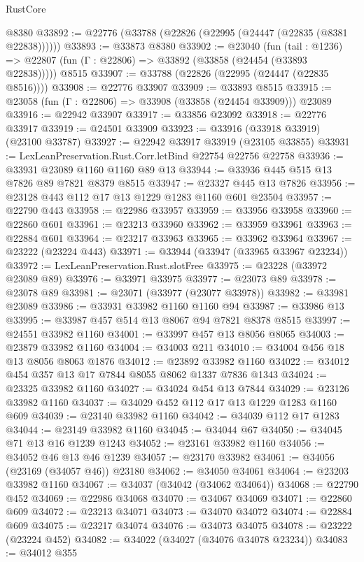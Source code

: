 \begin{lexlean}{RustCore}
\begin{coremodule}
    @8380
@33892 := @22776 (@33788 (@22826 (@22995 (@24447 (@22835 (@8381 @22838))))))
@33893 := @33873 @8380
@33902 := @23040
    (fun (tail : @1236) => @22807 (fun (Γ : @22806) => @33892 (@33858 (@24454 (@33893 @22838)))))
    @8515
@33907 := @33788 (@22826 (@22995 (@24447 (@22835 @8516))))
@33908 := @22776 @33907
@33909 := @33893 @8515
@33915 := @23058 (fun (Γ : @22806) => @33908 (@33858 (@24454 @33909))) @23089
@33916 := @22942 @33907
@33917 := @33856 @23092
@33918 := @22776 @33917
@33919 := @24501 @33909
@33923 := @33916 (@33918 @33919) (@23100 @33787)
@33927 := @22942 @33917 @33919 (@23105 @33855)
@33931 := LexLeanPreservation.Rust.Corr.letBind @22754 @22756 @22758
@33936 := @33931 @23089 @1160 @1160 @89 @13
@33944 := @33936 @445 @515 @13 @7826 @89 @7821 @8379 @8515
@33947 := @23327 @445 @13 @7826
@33956 := @23128 @443 @112 @17 @13 @1229 @1283 @1160 @601 @23504
@33957 := @22790 @443
@33958 := @22986 @33957
@33959 := @33956 @33958
@33960 := @22860 @601
@33961 := @23213 @33960
@33962 := @33959 @33961
@33963 := @22884 @601
@33964 := @23217 @33963
@33965 := @33962 @33964
@33967 := @23222 (@23224 @443)
@33971 := @33944 (@33947 (@33965 @33967 @23234))
@33972 := LexLeanPreservation.Rust.slotFree
@33975 := @23228 (@33972 @23089 @89)
@33976 := @33971 @33975
@33977 := @23073 @89
@33978 := @23078 @89
@33981 := @23071 (@33977 (@23077 @33978))
@33982 := @33981 @23089
@33986 := @33931 @33982 @1160 @1160 @94
@33987 := @33986 @13
@33995 := @33987 @457 @514 @13 @8067 @94 @7821 @8378 @8515
@33997 := @24551 @33982 @1160
@34001 := @33997 @457 @13 @8056 @8065
@34003 := @23879 @33982 @1160
@34004 := @34003 @211
@34010 := @34004 @456 @18 @13 @8056 @8063 @1876
@34012 := @23892 @33982 @1160
@34022 := @34012 @454 @357 @13 @17 @7844 @8055 @8062 @1337 @7836 @1343
@34024 := @23325 @33982 @1160
@34027 := @34024 @454 @13 @7844
@34029 := @23126 @33982 @1160
@34037 := @34029 @452 @112 @17 @13 @1229 @1283 @1160 @609
@34039 := @23140 @33982 @1160
@34042 := @34039 @112 @17 @1283
@34044 := @23149 @33982 @1160
@34045 := @34044 @67
@34050 := @34045 @71 @13 @16 @1239 @1243
@34052 := @23161 @33982 @1160
@34056 := @34052 @46 @13 @46 @1239
@34057 := @23170 @33982
@34061 := @34056 (@23169 (@34057 @46)) @23180
@34062 := @34050 @34061
@34064 := @23203 @33982 @1160
@34067 := @34037 (@34042 (@34062 @34064))
@34068 := @22790 @452
@34069 := @22986 @34068
@34070 := @34067 @34069
@34071 := @22860 @609
@34072 := @23213 @34071
@34073 := @34070 @34072
@34074 := @22884 @609
@34075 := @23217 @34074
@34076 := @34073 @34075
@34078 := @23222 (@23224 @452)
@34082 := @34022 (@34027 (@34076 @34078 @23234))
@34083 := @34012 @355

\end{coremodule}
\end{lexlean}
